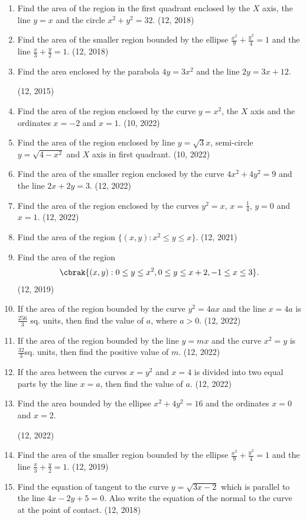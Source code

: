 \begin{enumerate}[label=\thesubsection.\arabic*,ref=\thesubsection.\theenumi]
\item Find the area of the region in the first quadrant enclosed by the $X$ axis, the line $y=x$ and the circle $x^{2}+y^{2}=32$. \hfill (12, 2018)
\item Find the area of the smaller region bounded by the ellipse $\frac{x^{2}}{9}+\frac{y^{2}}{4}=1$ and the line $\frac{x}{3}+\frac{y}{2}=1$. \hfill (12, 2018)
\item Find the area enclosed by the parabola $4y = 3x^2$ and the line $2y = 3x+12$. 

\hfill (12, 2015)
\item Find the area of the region enclosed by the curve $ y=x^2 $, the $X$ axis and the ordinates $x=-2$  and  $x=1$.
\hfill (10, 2022)
\item Find the area of the region enclosed by line $y=\sqrt{3}x$,  semi-circle $y=\sqrt{4-x^2}$ and $X$ axis in first quadrant.
\hfill (10, 2022)
\item Find the area of the smaller region enclosed by the curve ${4x^2 + 4y^2} = 9$ and the line $2x + 2y =3$.
\hfill (12, 2022)
\item Find the area of the region enclosed by the curves $y^2=x$, $x=\frac{1}{4}$,  $y=0$ and $x=1$.
\hfill (12, 2022)
\item Find the area of the region $\{(x,y) : x^2 \leq y \leq x\}$.
\hfill (12, 2021)
\item Find the area of the region 
\begin{align*}
    \cbrak{(x,y):0\leq y \leq x^{2},0 \leq y \leq x +2 , -1 \leq x \leq 3}.
\end{align*}
\hfill (12, 2019)

\item If the area of the region bounded by the curve $y^2 = 4ax$ and the line $x = 4a$ is $\frac{256}{3}$ sq. units, then find the value of $a$, where $a>0$.
\hfill (12, 2022)

\item If the area of the region bounded by the line $y=mx$ and the curve $x^2=y$ is $\frac{32}{3}$sq. units, then find the positive value of $m$.
\hfill (12, 2022)

\item If the area between the curves $x = y^2$ and $x = 4$ is divided into two equal parts by the line $x = a$, then find the value of $a$.
\hfill (12, 2022)

\item Find the area bounded by the ellipse $x^2+4y^2=16$ and the ordinates $x=0$ and $x=2$.

\hfill (12, 2022)

\item Find the area of the smaller region bounded by the ellipse $\frac{x^{2}}{9}+\frac{y^{2}}{4}=1$ and the line $\frac{x}{3}+\frac{y}{2}=1$.
\hfill (12, 2019)
\item Find the equation of tangent to the curve $y=\sqrt{3x-2}$ which is parallel to the line $4x-2y+5=0$. Also write the equation of the normal to the curve at the point of contact.
\hfill (12, 2018)


\end{enumerate}
